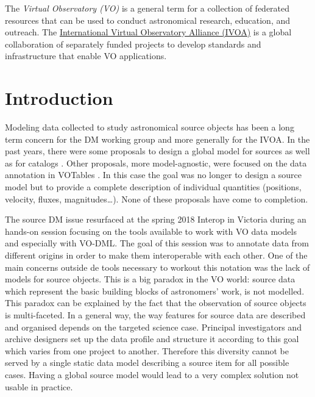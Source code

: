 \documentclass[11pt,a4paper]{ivoa}
\begin{document}
The \emph{Virtual Observatory (VO)} is a
general term for a collection of federated resources that can be used
to conduct astronomical research, education, and outreach.
The \href{http://www.ivoa.net}{International
Virtual Observatory Alliance (IVOA)} is a global
collaboration of separately funded projects to develop standards and
infrastructure that enable VO applications.


\section{Introduction}

Modeling data collected to study astronomical source objects has been a long term concern for the DM working group and more generally for the IVOA.
In the past years, there were some proposals to design a global model for sources \citep{wd:jesusdm} as well as for catalogs \citep{wd:catalog}.
Other proposals, more model-agnostic, were focused on the data annotation in VOTables \citep{note:stcvot} \citep{note:seb}.
In this case the goal was no longer to design a source model but to provide a complete description of  individual quantities (positions, velocity, fluxes, magnitudes…).
None of these proposals have come to completion.

The source DM issue resurfaced at the spring 2018 Interop in Victoria during an hands-on session focusing on the tools available to work with VO data models and especially with VO-DML.
The goal of this session was to annotate data from different origins in order to make them interoperable with each other.
One of the main concerns outside de tools necessary to workout this notation was the lack of models for source objects.
This is a big paradox in the VO world: source data which represent the basic building blocks of astronomers' work, is not modelled.
This paradox can be explained by the fact that the observation of source objects is multi-faceted.
In a general way, the way features for source data are described and organised depends on the targeted science case.
Principal investigators and archive designers set up the data profile and structure it according to this goal which varies from one project to another.
Therefore this diversity cannot be served by a single static data model describing a source item for all possible cases.
Having a global source model would lead to a very complex solution not usable in practice.
\end{document}
